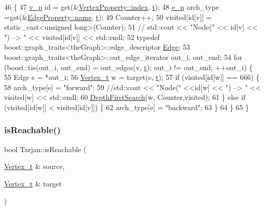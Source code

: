 \begin{DoxyCode}
46                                                                                 \{
47     \hyperlink{utilities_8h_a3f4959b3d837fa6351a9414c79280286}{v\_p} \textcolor{keywordtype}{id} = \textcolor{keyword}{get}(&\hyperlink{struct_utility_structs_1_1_vertex_property_a636cb729438e999aa3d9a17ac39d8641}{VertexProperty::index}, \hyperlink{class_tarjan_a54b0703f885a3514ea0bf4cdbc7fdaad}{t});
48     \hyperlink{utilities_8h_afdd46ecdd7dd04aa38394e7af744a510}{e\_p} arch\_type =\textcolor{keyword}{get}(&\hyperlink{struct_utility_structs_1_1_edge_property_a0701d898f719b1efbf795d80f503de81}{EdgeProperty::name}, \hyperlink{class_tarjan_a54b0703f885a3514ea0bf4cdbc7fdaad}{t});
49     Counter++;
50     visited[\textcolor{keywordtype}{id}[v]] = \textcolor{keyword}{static\_cast<}\textcolor{keywordtype}{unsigned} \textcolor{keywordtype}{long}\textcolor{keyword}{>}(Counter);
51  \textcolor{comment}{//   std::cout << "Node(" << id[v] << ") --> " << visited[id[v]] << std::endl;}
52     \textcolor{keyword}{typedef} boost::graph\_traits<theGraph>::edge\_descriptor \hyperlink{class_graph_component_aa7517b2af08aa717324076a645c73fe6}{Edge};
53     boost::graph\_traits<theGraph>::out\_edge\_iterator out\_i, out\_end;
54     \textcolor{keywordflow}{for} (boost::tie(out\_i, out\_end) = out\_edges(v, \hyperlink{class_tarjan_a54b0703f885a3514ea0bf4cdbc7fdaad}{t}); out\_i != out\_end; ++out\_i) \{
55         Edge e = *out\_i;
56         \hyperlink{utilities_8h_a344cd987714d06997f0becda3c96d6e2}{Vertex\_t} w = target(e, \hyperlink{class_tarjan_a54b0703f885a3514ea0bf4cdbc7fdaad}{t});
57         \textcolor{keywordflow}{if} (visited[\textcolor{keywordtype}{id}[w]] == 666) \{
58             arch\_type[e] = \textcolor{stringliteral}{"forward"};
59             \textcolor{comment}{//std::cout << "Node(" <<id[w] << ") --> " << visited[w] << std::endl;}
60             \hyperlink{class_tarjan_a277c58dc6f712a6ae1ef2e59c9ad58e1}{DepthFirstSearch}(w, Counter,visited);
61         \} \textcolor{keywordflow}{else} \textcolor{keywordflow}{if} (visited[\textcolor{keywordtype}{id}[w]] < visited[\textcolor{keywordtype}{id}[v]]) \{
62             arch\_type[e] = \textcolor{stringliteral}{"backward"};
63         \}
64     \}
65 \}
\end{DoxyCode}
\mbox{\label{class_tarjan_a74f69dfaa1d4cf3bac06aef7a704c0b8}} 
\subsubsection{\texorpdfstring{is\+Reachable()}{isReachable()}}
{\footnotesize\ttfamily bool Tarjan\+::is\+Reachable (\begin{DoxyParamCaption}\item[{\hyperlink{class_graph_component_ae67114a6ce5a001dc35e1996e1b45aa0}{Vertex\+\_\+t} \&}]{source,  }\item[{\hyperlink{class_graph_component_ae67114a6ce5a001dc35e1996e1b45aa0}{Vertex\+\_\+t} \&}]{target }\end{DoxyParamCaption})}




